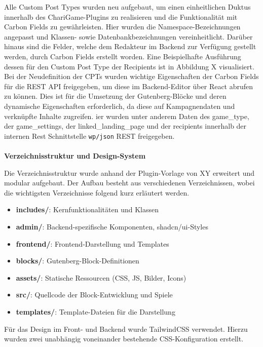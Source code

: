 Alle Custom Post Types wurden neu aufgebaut, um einen einheitlichen Duktus innerhalb des ChariGame-Plugins zu realisieren und die Funktionalität mit Carbon Fields zu gewährleisten.
Hier wurden die Namespace-Bezeichnungen angepasst und Klassen- sowie Datenbankbezeichnungen vereinheitlicht.
Darüber hinaus sind die Felder, welche dem Redakteur im Backend zur Verfügung gestellt werden, durch Carbon Fields erstellt worden.
Eine Beispielhafte Ausführung dessen für den Custom Post Type der Recipients ist in Abbildung X visualisiert. %
Bei der Neudefinition der CPTs wurden wichtige Eigenschaften der Carbon Fields für die REST API freigegeben, um diese im Backend-Editor über React abrufen zu können.
Dies ist für die Umsetzung der Gutenberg-Blöcke und deren dynamische Eigenschaften erforderlich, da diese auf Kampagnendaten und verknüpfte Inhalte zugreifen.
ier wurden unter anderem Daten des game\_type, der game\_settings, der linked\_landing\_page und der recipients innerhalb der internen Rest Schnittstelle \texttt{wp/json} REST freigegeben. %
\\\\
\textbf{Verzeichnisstruktur und Design-System}

Die Verzeichnisstruktur wurde anhand der Plugin-Vorlage von XY erweitert und modular aufgebaut.
Der Aufbau besteht aus verschiedenen Verzeichnissen, wobei die wichtigsten Verzeichnisse folgend kurz erläutert werden.

\begin{itemize}
    \item \textbf{includes/}: Kernfunktionalitäten und Klassen
    \item \textbf{admin/}: Backend-spezifische Komponenten, shadcn/ui-Styles
    \item \textbf{frontend/}: Frontend-Darstellung und Templates
    \item \textbf{blocks/}: Gutenberg-Block-Definitionen
    \item \textbf{assets/}: Statische Ressourcen (CSS, JS, Bilder, Icons)
    \item \textbf{src/}: Quellcode der Block-Entwicklung und Spiele
    \item \textbf{templates/}: Template-Dateien für die Darstellung
\end{itemize}

Für das Design im Front- und Backend wurde TailwindCSS verwendet.
Hierzu wurden zwei unabhängig voneinander bestehende CSS-Konfiguration erstellt.

